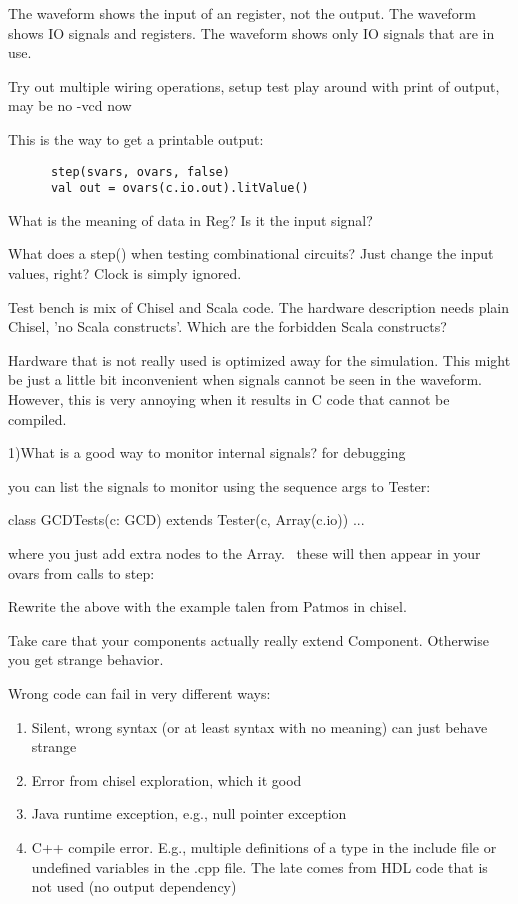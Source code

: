 \documentclass[a4paper, conference]{IEEEtran}
\begin{document}
The waveform shows the input of an register, not the output.
The waveform shows IO signals and registers.
The waveform shows only IO signals that are in use.

Try out multiple wiring operations, setup test play around with print of output, may be no -vcd now

This is the way to get a printable output:

\begin{verbatim}
      step(svars, ovars, false)
      val out = ovars(c.io.out).litValue()
\end{verbatim}


What is the meaning of data in Reg? Is it the input signal?

What does a step() when testing combinational circuits? Just change the input values, right? Clock is simply ignored.

Test bench is mix of Chisel and Scala code. The hardware description needs plain Chisel, 'no Scala constructs'. Which are the forbidden Scala constructs?

Hardware that is not really used is optimized away for the simulation.
This might be just a little bit inconvenient when signals cannot be seen in
the waveform. However, this is very annoying when it results in C code
that cannot be compiled.

1)What is a good way to monitor internal signals? for debugging

you can list the signals to monitor using the sequence args to Tester:

class GCDTests(c: GCD) extends Tester(c, Array(c.io)) ...

where you just add extra nodes to the Array.  these will then appear in your ovars from calls to step:

Rewrite the above with the example talen from Patmos in chisel.

Take care that your components actually really extend Component. Otherwise
you get strange behavior.

Wrong code can fail in very different ways:

\begin{enumerate}
\item Silent, wrong syntax (or at least syntax with no meaning) can just behave strange
\item Error from chisel exploration, which it good
\item Java runtime exception, e.g., null pointer exception
\item C++ compile error. E.g., multiple definitions of a type in the include file or undefined
variables in the .cpp file. The late comes from HDL code that is not used (no output dependency)
\end{enumerate}
\end{document}
